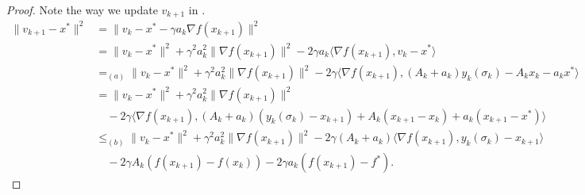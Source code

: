 \documentclass{article}
\numberwithin{equation}{section}
\numberwithin{equation}{section}
\begin{document}
\begin{proof}
    Note the way we update $v_{k+1}$ in .
    \begin{align*}
        \|v_{k+1} - x^*\|^2
         & = \|v_k - x^* - \gamma a_k \nabla f(x_{k+1})\|^2                                                                                                             \\
         & = \|v_k - x^*\|^2 + \gamma^2 a_k^2 \|\nabla f(x_{k+1})\|^2
        - 2\gamma a_k \langle \nabla f(x_{k+1}), v_k - x^* \rangle                                                                                                      \\
         & =_{(a)} \|v_k - x^*\|^2 + \gamma^2 a_k^2 \|\nabla f(x_{k+1})\|^2  - 2\gamma \langle \nabla f(x_{k+1}), (A_k + a_k) y_k(\sigma_k) - A_k x_k - a_k x^* \rangle \\
         & = \|v_k - x^*\|^2 + \gamma^2 a_k^2 \|\nabla f(x_{k+1})\|^2                                                                                                   \\
         & \quad - 2\gamma \langle \nabla f(x_{k+1}),
        (A_k + a_k)(y_k(\sigma_k) - x_{k+1}) + A_k(x_{k+1} - x_k)
        + a_k(x_{k+1} - x^*) \rangle                                                                                                                                    \\
         & \leq_{(b)} \|v_k - x^*\|^2 + \gamma^2 a_k^2 \|\nabla f(x_{k+1})\|^2 - 2\gamma (A_k + a_k) \langle \nabla f(x_{k+1}), y_k(\sigma_k) - x_{k+1} \rangle         \\
         & \quad - 2\gamma A_k \left(f(x_{k+1}) - f(x_k)\right)
        - 2\gamma a_k \left(f(x_{k+1}) - f^*\right).
    \end{align*}


\end{proof}
\end{document}
